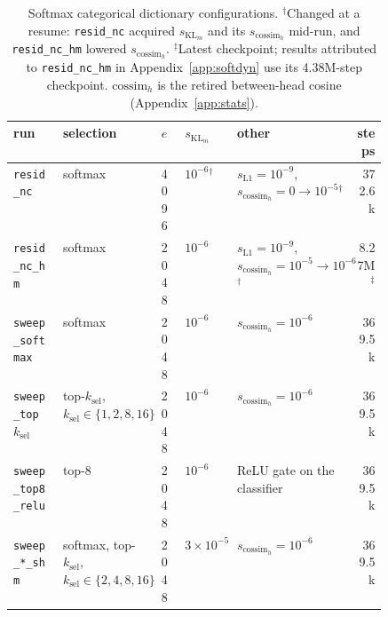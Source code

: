 \begin{table}[tp]
\vspace{8pt}
{\footnotesize\setlength{\tabcolsep}{4pt}%
\begin{tabular}{@{}l>{\raggedright\arraybackslash}p{0.22\linewidth}ll%
>{\raggedright\arraybackslash}p{0.27\linewidth}r@{}}
\toprule
run & selection & $e$ & $s_{\mathrm{KL}_m}$ & other & steps \\
\midrule
\texttt{resid\_nc} & softmax & 4096 & $10^{-6}$$^\dagger$ & $s_{\mathrm{L1}}{=}10^{-9}$, $s_{\mathrm{cossim}_h}{=}0 \to 10^{-5}$$^\dagger$ & 372.6k \\
\texttt{resid\_nc\_hm} & softmax & 2048 & $10^{-6}$ & $s_{\mathrm{L1}}{=}10^{-9}$, $s_{\mathrm{cossim}_h}{=}10^{-5} \to 10^{-6}$$^\dagger$ & 8.27M$^\ddagger$ \\
\texttt{sweep\_softmax} & softmax & 2048 & $10^{-6}$ & $s_{\mathrm{cossim}_h}{=}10^{-6}$ & 369.5k \\
\texttt{sweep\_top}$k_{\mathrm{sel}}$ & top-$k_{\mathrm{sel}}$, $k_{\mathrm{sel}} \in \{1, 2, 8, 16\}$ & 2048 & $10^{-6}$ & $s_{\mathrm{cossim}_h}{=}10^{-6}$ & 369.5k \\
\texttt{sweep\_top8\_relu} & top-8 & 2048 & $10^{-6}$ & ReLU gate on the classifier & 369.5k \\
\texttt{sweep\_*\_shm} & softmax, top-$k_{\mathrm{sel}}$, $k_{\mathrm{sel}} \in \{2, 4, 8, 16\}$ & 2048 & $3\times10^{-5}$ & $s_{\mathrm{cossim}_h}{=}10^{-6}$ & 369.5k \\
\bottomrule
\end{tabular}}
\caption{Softmax categorical dictionary configurations. $^\dagger$Changed
at a resume: \texttt{resid\_nc} acquired $s_{\mathrm{KL}_m}$ and its
$s_{\mathrm{cossim}_h}$ mid-run, and \texttt{resid\_nc\_hm} lowered
$s_{\mathrm{cossim}_h}$.
$^\ddagger$Latest checkpoint; results attributed to \texttt{resid\_nc\_hm}
in Appendix~\ref{app:softdyn} use its 4.38M-step checkpoint.
$\mathrm{cossim}_h$ is the retired between-head cosine
(Appendix~\ref{app:stats}).}
\label{tab:cfg-softmax}
\end{table}
